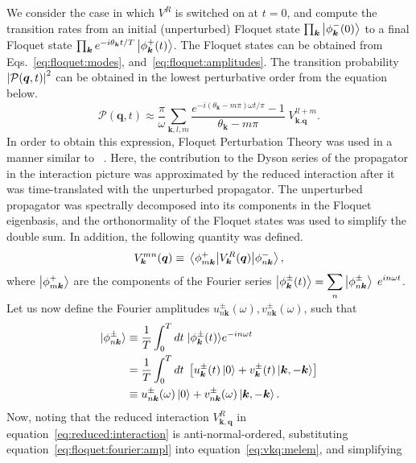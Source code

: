 \documentclass[preprint,5p,times,twocolumn]{elsarticle}
\newcommand{\bmk}{\bm{k}}
\newcommand{\bmq}{\bm{q}}
\begin{document}
We consider the case in which $V^R$ is switched on at $t=0$, and compute the transition rates from an initial (unperturbed) Floquet state $\prod_{\bmk}\ket{\phi^{-}_{\bmk}(0)}$ to a final Floquet state $\prod_{\bmk}e^{-i\theta_{\bmk}t/T}\ket{\phi^{+}_{\bmk}(t)}$. The Floquet states can be obtained from Eqs.~\ref{eq:floquet:modes}, and~\ref{eq:floquet:amplitudes}. The transition probability $\abs{\mathcal{P}(\bmq, t)}^2$ can be obtained in the lowest perturbative order from the equation below.
\begin{equation}
    \mathcal{P}(\bmq, t)  \approx  \frac{\pi}{\omega}
    \sum_{\bmk, l , m} \frac{e^{-i\left(\theta_{\bmk}-m\pi\right)\omega t/\pi}-1}{\theta_{\bmk}-m\pi}\;V_{\bmk.\bmq}^{l l+m}.
    \label{eq:aqt}
\end{equation}
In order to obtain this expression, Floquet Perturbation Theory was used in a manner similar to ~\citep{PhysRevA.91.033601, Sen_2021}. Here, the contribution to the Dyson series of the propagator in the interaction picture was approximated by the reduced interaction after it was time-translated with the unperturbed propagator. The unperturbed propagator was spectrally decomposed into its components in the Floquet eigenbasis, and the orthonormality of the Floquet states was used to simplify the double sum. In addition, the following quantity was defined.
\begin{equation}
    V_{\bmk}^{m n}(\bmq)\equiv\mel{\phi^+_{m\bmk}}{V^R_{\bmk}(\bmq)}{\phi^-_{n\bmk}},
    \label{eq:vkq:melem}
\end{equation}
where $\ket{\phi^+_{m\bmk}}$ are the components of the Fourier series $\ket{\phi^\pm_{\bmk}(t)} = \displaystyle\sum_n \ket{\phi^{\pm}_{n\bmk}}\;e^{in\omega t}$. Let us now define the Fourier amplitudes $u^\pm_{n\bmk}(\omega), v^\pm_{n\bmk}(\omega)$, such that
\begin{align}
    |\phi^\pm_{n\bmk} \rangle &\equiv \frac{1}{T} \int^{T}_{0}dt\; |\phi^\pm_{\bmk}(t)\rangle e^{-in\omega t} \nonumber \\
    &= \frac{1}{T} \int^{T}_{0}dt\; \left[u_{\bmk}^{\pm}(t)\ket{0} + v_{\bmk}^{\pm}(t) \ket{\bmk, -\bmk} \right] \nonumber\\
    &\equiv u_{n\bmk}^{\pm}(\omega)\ket{0} + v_{n\bmk}^{\pm}(\omega)\ket{\bmk, -\bmk}. 
    \label{eq:floquet:fourier:ampl}
\end{align}
Now, noting that the reduced interaction $V^R_{\bmk,\bmq}$ in equation~\ref{eq:reduced:interaction} is anti-normal-ordered, substituting equation~\ref{eq:floquet:fourier:ampl} into equation~\ref{eq:vkq:melem}, and simplifying
\end{document}
